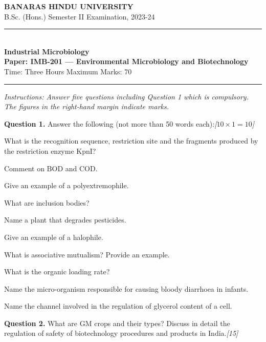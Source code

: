 \documentclass[11pt,a4paper]{article}
\newcommand{\pts}[1]{\hfill   \textit{[#1]}}
\begin{document}
\begin{center}
  {\large\bfseries BANARAS HINDU UNIVERSITY}\\[2pt]
  {\normalsize B.Sc. (Hons.) Semester II Examination, 2023-24}\\[6pt]
  \rule{0.8\linewidth}{0.5pt}\\[6pt]
  {\large\bfseries Industrial Microbiology}\\[4pt]
  {\large\bfseries Paper: IMB-201 --- Environmental Microbiology and Biotechnology}\\[4pt]
  {\normalsize Time: Three Hours \hfill Maximum Marks: 70}
\end{center}

\rule{\linewidth}{0.4pt}

\smallskip



\noindent   \textit{Instructions: Answer five questions including Question 1 which is compulsory. The figures in the right-hand margin indicate marks.}

\bigskip

\medskip


\noindent   \textbf{Question 1.} Answer the following (not more than 50 words each):\pts{$10  \times 1 = 10$}

\begin{parts}
  \item What is the recognition sequence, restriction site and the fragments produced by the restriction enzyme KpnI?
  \item Comment on BOD and COD.
  \item Give an example of a polyextremophile.
  \item What are inclusion bodies?
  \item Name a plant that degrades pesticides.
  \item Give an example of a halophile.
  \item What is associative mutualism? Provide an example.
  \item What is the organic loading rate?
  \item Name the micro-organism responsible for causing bloody diarrhoea in infants.
  \item Name the channel involved in the regulation of glycerol content of a cell.
\end{parts}

\medskip


\noindent   \textbf{Question 2.} What are GM crops and their types? Discuss in detail the regulation of safety of biotechnology procedures and products in India.\pts{15}
\end{document}
